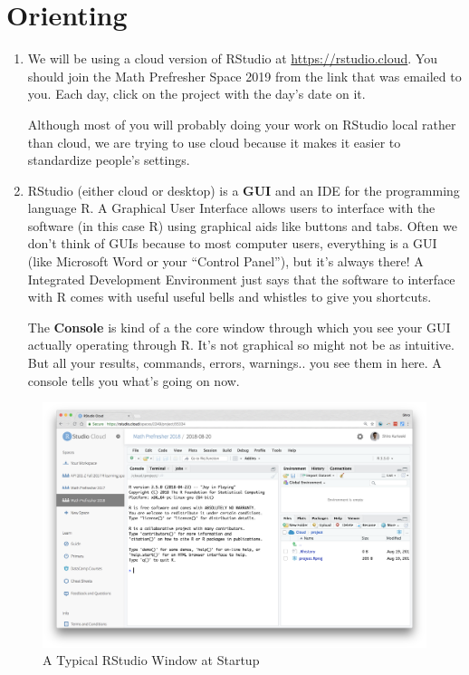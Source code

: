 \documentclass[]{book}
\theoremstyle{definition}
\theoremstyle{definition}
\theoremstyle{definition}
\theoremstyle{remark}
\begin{document}
\hypertarget{orienting}{%
\section{Orienting}\label{orienting}}

\begin{enumerate}
\def\labelenumi{\arabic{enumi}.}
\item
  We will be using a cloud version of RStudio at \url{https://rstudio.cloud}. You should join the Math Prefresher Space 2019 from the link that was emailed to you. Each day, click on the project with the day's date on it.

  Although most of you will probably doing your work on RStudio local rather than cloud, we are trying to use cloud because it makes it easier to standardize people's settings.
\item
  RStudio (either cloud or desktop) is a \textbf{GUI} and an IDE for the programming language R. A Graphical User Interface allows users to interface with the software (in this case R) using graphical aids like buttons and tabs. Often we don't think of GUIs because to most computer users, everything is a GUI (like Microsoft Word or your ``Control Panel''), but it's always there! A Integrated Development Environment just says that the software to interface with R comes with useful useful bells and whistles to give you shortcuts.

  The \textbf{Console} is kind of a the core window through which you see your GUI actually operating through R. It's not graphical so might not be as intuitive. But all your results, commands, errors, warnings.. you see them in here. A console tells you what's going on now.
\end{enumerate}

\begin{figure}
\centering
\includegraphics{images/11_1_rstudio-startup.png}
\caption{A Typical RStudio Window at Startup}
\end{figure}
\end{document}
